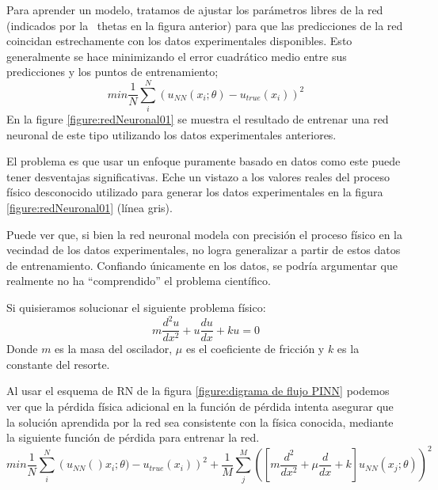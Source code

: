 Para aprender un modelo, tratamos de ajustar los parámetros libres de la red (indicados por la \ thetas en la figura anterior) para que las predicciones de la red coincidan estrechamente con los datos experimentales disponibles. Esto generalmente se hace minimizando el error cuadrático medio entre sus predicciones y los puntos de entrenamiento;
\begin{equation}
    min \frac{1}{N} \sum^N_i \left(u_{NN}(x_i;\theta) - u_{true}(x_i)\right)^2
\end{equation}
En la figure \ref{figure:redNeuronal01} se muestra el resultado de entrenar una red neuronal de este tipo utilizando los datos experimentales anteriores.

El problema es que usar un enfoque puramente basado en datos como este puede tener desventajas significativas. Eche un vistazo a los valores reales del proceso físico desconocido utilizado para generar los datos experimentales en la figura \ref{figure:redNeuronal01} (línea gris).

Puede ver que, si bien la red neuronal modela con precisión el proceso físico en la vecindad de los datos experimentales, no logra generalizar a partir de estos datos de entrenamiento. Confiando únicamente en los datos, se podría argumentar que realmente no ha “comprendido” el problema científico.

Si quisieramos solucionar el siguiente problema físico:
\begin{equation}
    m \frac{d^2 u}{d x^2} + u\frac{du}{dx} + ku = 0
\end{equation}
Donde $m$ es la masa del oscilador, $\mu$ es el coeficiente de fricción y $k$ es la constante del resorte.

Al usar el esquema de RN de la figura \ref{figure:digrama de flujo PINN} podemos ver que la pérdida física adicional en la función de pérdida intenta asegurar  que la solución aprendida por la red sea consistente con la física conocida, mediante la siguiente función de pérdida para entrenar la red.
\begin{equation}
    min \frac{1}{N}\sum^N_i \left(u_{NN}()x_i; \theta) - u_{true}(x_i)\right)^2 + \frac{1}{M}\sum^M_j\left(\left[m\frac{d^2}{dx^2}+\mu\frac{d}{dx}+k\right]u_{NN}(x_j;\theta)\right)^2
\end{equation}

